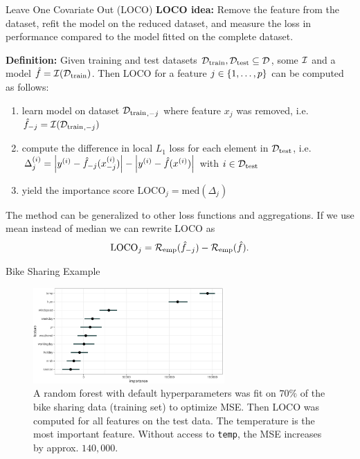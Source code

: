 \documentclass[11pt,compress,t,notes=noshow, aspectratio=169, xcolor=table]{beamer}
\begin{document}
\begin{frame}{Leave One Covariate Out (LOCO)  }
%
\textbf{LOCO idea:} Remove the feature from the dataset, refit the model on the reduced dataset, and measure the loss in performance compared to the model fitted on the complete dataset. %

\pause\lz

\textbf{Definition:} Given training and test datasets $\Dtrain, \Dtest \subseteq \D$, some $\inducer$ and a model $\fh = \inducer(\Dtrain)$. Then LOCO for a feature $j \in \pset$ can be computed as follows:
  \begin{enumerate}
    \item learn model on dataset ${\Dtrain}_{,-j}$ where feature $x_j$ was removed, i.e. $\fh_{-j} = \inducer({\Dtrain}_{,-j})$\pause
    \item compute the difference in local $L_1$ loss for each element in $\Dtest$, i.e. $\Delta_j^{(i)} = \left  |y^{(i)} - \fh_{-j}(x_{-j}^{(i)}) \right | - \left |y^{(i)} - \fh(x^{(i)}) \right | $ with $i \in \Dtest$\pause
    \item yield the importance score $\text{LOCO}_j = \text{med} \left ( \Delta_j  \right )$
  \end{enumerate}
\lz\pause
The method can be generalized to other loss functions and aggregations. If we use mean instead of median we can rewrite LOCO as
%
$$ \text{LOCO}_j = \riske(\fh_{-j}) - \riske(\fh).$$
\end{frame}

\begin{frame}{Bike Sharing Example}
%
\begin{figure}
  \centering
  \includegraphics[width=0.65\textwidth]{figure_man/bike_sharing_loco.pdf}
\caption{A random forest with default hyperparameters was fit on $70\%$ of the bike sharing data (training set) to optimize MSE. Then LOCO was computed for all features on the test data. The temperature is the most important feature. Without access to \texttt{temp}, the MSE increases by approx. $140,000$.}
\end{figure}
%
%
\end{frame}
\end{document}
